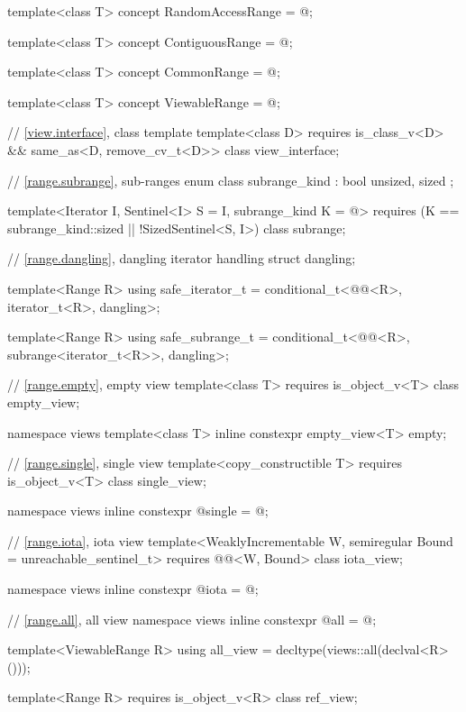 \begin{codeblock}
{  template<class T>
    concept RandomAccessRange = @\seebelow@;

  template<class T>
    concept ContiguousRange = @\seebelow@;

  template<class T>
    concept CommonRange = @\seebelow@;

  template<class T>
    concept ViewableRange = @\seebelow@;

  // \ref{view.interface}, class template 
  template<class D>
    requires is_class_v<D> && same_as<D, remove_cv_t<D>>
  class view_interface;

  // \ref{range.subrange}, sub-ranges
  enum class subrange_kind : bool { unsized, sized };

  template<Iterator I, Sentinel<I> S = I, subrange_kind K = @\seebelow@>
    requires (K == subrange_kind::sized || !SizedSentinel<S, I>)
  class subrange;

  // \ref{range.dangling}, dangling iterator handling
  struct dangling;

  template<Range R>
    using safe_iterator_t = conditional_t<@@<R>, iterator_t<R>, dangling>;

  template<Range R>
    using safe_subrange_t =
      conditional_t<@@<R>, subrange<iterator_t<R>>, dangling>;

  // \ref{range.empty}, empty view
  template<class T>
    requires is_object_v<T>
  class empty_view;

  namespace views {
    template<class T>
      inline constexpr empty_view<T> empty{};
  }

  // \ref{range.single}, single view
  template<copy_constructible T>
    requires is_object_v<T>
  class single_view;

  namespace views { inline constexpr @\unspec@ single = @\unspec@; }

  // \ref{range.iota}, iota view
  template<WeaklyIncrementable W, semiregular Bound = unreachable_sentinel_t>
    requires @@<W, Bound>
  class iota_view;

  namespace views { inline constexpr @\unspec@ iota = @\unspec@; }

  // \ref{range.all}, all view
  namespace views { inline constexpr @\unspec@ all = @\unspec@; }

  template<ViewableRange R>
    using all_view = decltype(views::all(declval<R>()));

  template<Range R>
    requires is_object_v<R>
  class ref_view;

}
\end{codeblock}
